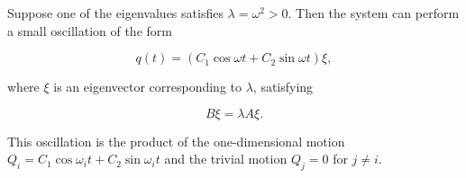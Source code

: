 Suppose one of the eigenvalues satisfies $\lambda = \omega^2 > 0$. Then the system can perform a small oscillation of the form

$$q(t) = (C_1 \cos \omega t + C_2 \sin \omega t) \xi,$$

where $\xi$ is an eigenvector corresponding to $\lambda$, satisfying

$$B \xi = \lambda A \xi.$$

This oscillation is the product of the one-dimensional motion $Q_i = C_1 \cos \omega_i t + C_2 \sin \omega_i t$ and the trivial motion $Q_j = 0$ for $j \neq i$.
